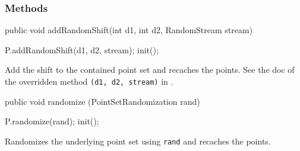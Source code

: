 \subsubsection*{Methods}
\begin{code}

   public void addRandomShift(int d1, int d2, RandomStream stream)\begin{hide} {
        P.addRandomShift(d1, d2, stream);
        init();
   }\end{hide}
\end{code}
\begin{tabb}
Add the shift to the contained point set and recaches the points. See the doc of the
overridden method \texttt{(d1, d2, stream)} in .
\end{tabb}
\begin{code}

   public void randomize (PointSetRandomization rand)\begin{hide} {
      P.randomize(rand);
      init();
   }\end{hide}
\end{code}
\begin{tabb}
Randomizes the underlying point set using \texttt{rand} and
recaches the points.
\end{tabb}
\begin{code}\begin{hide}

   public String toString() {
     StringBuffer sb = new StringBuffer ("Cached point set" +
          PrintfFormat.NEWLINE);
     sb.append (super.toString());
     sb.append (PrintfFormat.NEWLINE + "Cached point set information {"
                + PrintfFormat.NEWLINE);
     sb.append (P.toString());
     sb.append (PrintfFormat.NEWLINE + "}");
     return sb.toString();
   }

   public double getCoordinate (int i, int j) {
      return x[i][j];
   }

}
\end{hide}
\end{code}
